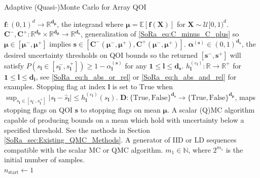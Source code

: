 \documentclass[graybox]{svmult}
\begin{document}
\begin{algorithm}[t]
    \caption{Adaptive (Quasi-)Monte Carlo for Array QOI}
    \label{SoRa_algo:MCStoppingCriterion}
    \begin{algorithmic}
    \Require $\boldsymbol{f}: (0,1)^d \to \mathbb{R}^{\boldsymbol{d}_{\boldsymbol{\mu}}}$, the integrand where $\boldsymbol{\mu} = \mathbb{E}[\boldsymbol{f}(\boldsymbol{X})]$ for $\boldsymbol{X} \sim \mathcal{U}[0,1)^d$.
    \Require $\boldsymbol{C}^-,\boldsymbol{C}^+: \mathbb{R}^{\boldsymbol{d}_{\boldsymbol{\mu}}} \times \mathbb{R}^{\boldsymbol{d}_{\boldsymbol{\mu}}} \to \mathbb{R}^{\boldsymbol{d}_{\boldsymbol{s}}}$, generalization of \eqref{SoRa_eq:C_minus_C_plus} so $\boldsymbol{\mu} \in [\boldsymbol{\mu}^-,\boldsymbol{\mu}^+]$ implies $\boldsymbol{s} \in [\boldsymbol{C}^-(\boldsymbol{\mu}^-,\boldsymbol{\mu}^+),\boldsymbol{C}^+(\boldsymbol{\mu}^-,\boldsymbol{\mu}^+)]$.
    \Require $\boldsymbol{\alpha}^{(\boldsymbol{s})} \in (0,1)^{\boldsymbol{d}_{\boldsymbol{s}}}$, the desired uncertainty thresholds on QOI bounds so the returned $[\boldsymbol{s}^-,\boldsymbol{s}^+]$ will satisfy $P(s_{\boldsymbol{l}} \in [s_{\boldsymbol{l}}^-,s_{\boldsymbol{l}}^+]) \geq 1-\alpha^{(\boldsymbol{s})}_{\boldsymbol{l}}$ for any $\boldsymbol{1} \leq \boldsymbol{l} \leq \boldsymbol{d}_{\boldsymbol{s}}$.
    \Require $h^{(\varepsilon_{\boldsymbol{l}})}_{\boldsymbol{l}}: \mathbb{R} \to \mathbb{R}^+$ for $\boldsymbol{1} \leq \boldsymbol{l} \leq \boldsymbol{d}_{\boldsymbol{l}}$, see \eqref{SoRa_eq:h_abs_or_rel} or \eqref{SoRa_eq:h_abs_and_rel} for examples. Stopping flag at index $\boldsymbol{l}$ is set to $\text{True}$ when $\sup_{s_{\boldsymbol{l}} \in [s_{\boldsymbol{l}}^-,s_{\boldsymbol{l}}^+]} \lvert s_{\boldsymbol{l}} - \hat{s}_{\boldsymbol{l}} \rvert \leq h^{(\varepsilon_{\boldsymbol{l}})}_{\boldsymbol{l}}(s_{\boldsymbol{l}})$.
    \Require $\boldsymbol{D}: \{\text{True},\text{False}\}^{\boldsymbol{d}_{\boldsymbol{s}}} \to \{\text{True},\text{False}\}^{\boldsymbol{d}_{\boldsymbol{\mu}}}$, maps stopping flags on QOI $\boldsymbol{s}$ to stopping flags on mean $\boldsymbol{\mu}$. 
    \Require A scalar (Q)MC algorithm capable of producing bounds on a mean which hold with uncertainty below a specified threshold. See the methods in Section \ref{SoRa_sec:Existing_QMC_Methods}.
    \Require A generator of IID or LD sequences compatible with the scalar MC or QMC algorithm. 
    \Require $m_1 \in \mathbb{N}$, where $2^{m_1}$ is the initial number of samples.
    \\ \hrulefill
    \State $n_\text{start} \gets 1$ 

\end{algorithmic}
\end{algorithm}
\end{document}
